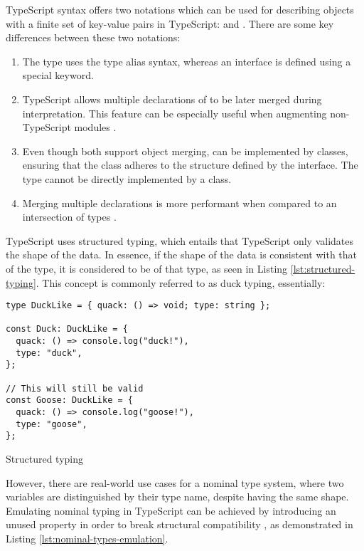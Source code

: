 TypeScript syntax offers two notations which can be used for describing objects with a finite set of key-value pairs in TypeScript:  and . There are some key differences between these two notations:

\begin{enumerate}
  \item The  type uses the type alias syntax, whereas an interface is defined using a special  keyword.
  \item TypeScript allows multiple declarations of  to be later merged during interpretation. This feature can be especially useful when augmenting non-TypeScript modules \cite{DocumentationDeclarationMerging}.
  \item Even though both support object merging,  can be implemented by classes, ensuring that the class adheres to the structure defined by the interface. The  type cannot be directly implemented by a class.
  \item Merging multiple  declarations is more performant when compared to an intersection of  types \cite{Performance}.
\end{enumerate}

TypeScript uses structured typing, which entails that TypeScript only validates the shape of the data. In essence, if the shape of the data is consistent with that of the type, it is considered to be of that type, as seen in Listing \ref{lst:structured-typing}. This concept is commonly referred to as duck typing, essentially: 

\begin{listing}[ht]
  \begin{verbatim}
type DuckLike = { quack: () => void; type: string };

const Duck: DuckLike = {
  quack: () => console.log("duck!"),
  type: "duck",
};

// This will still be valid
const Goose: DuckLike = {
  quack: () => console.log("goose!"),
  type: "goose",
};
\end{verbatim}
  \caption{Structured typing}\label{lst:structured-typing}
\end{listing}

However, there are real-world use cases for a nominal type system, where two variables are distinguished by their type name, despite having the same shape. Emulating nominal typing in TypeScript can be achieved by introducing an unused property in order to break structural compatibility \cite{NominalTyping}, as demonstrated in Listing \ref{lst:nominal-types-emulation}.

